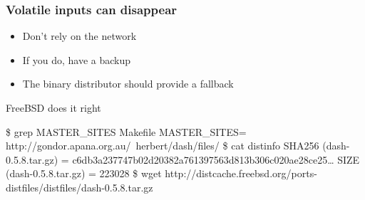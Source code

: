 \documentclass[14pt,aspectratio=169]{beamer}
\begin{document}
\begin{frame}[fragile]
\frametitle{Volatile inputs can disappear}

\begin{itemize}
\item Don't rely on the network
\item If you do, have a backup
\item The binary distributor should provide a fallback
\end{itemize}

\begin{block}{\small FreeBSD does it right}\footnotesize
\begin{semiverbatim}
\$ grep MASTER\_SITES Makefile
MASTER\_SITES= http://gondor.apana.org.au/~herbert/dash/files/
\$ cat distinfo
SHA256 (dash-0.5.8.tar.gz) = c6db3a237747b02d20382a761397563d813b306c020ae28ce25…
SIZE (dash-0.5.8.tar.gz) = 223028
\$ wget http://distcache.freebsd.org/ports-distfiles/distfiles/dash-0.5.8.tar.gz
\end{semiverbatim}
\end{block}
\end{frame}

\begin{frame}[plain]
\end{frame}
\end{document}
